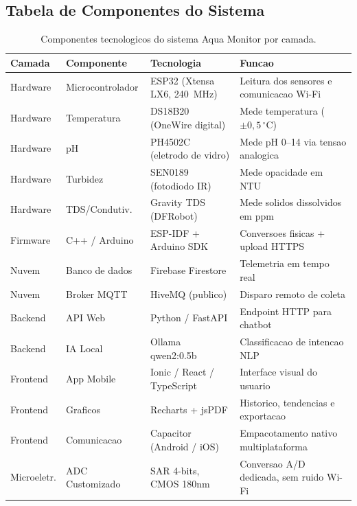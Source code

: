 \documentclass[12pt, a4paper]{article}
\begin{document}
\subsection{Tabela de Componentes do Sistema}

\begin{table}[H]
\centering
\small
\caption{Componentes tecnologicos do sistema Aqua Monitor por camada.}
\label{tab:componentes}
\begin{tabular}{p{2.0cm}p{2.4cm}p{4.2cm}p{4.8cm}}
\toprule
\textbf{Camada} & \textbf{Componente} & \textbf{Tecnologia} & \textbf{Funcao}\\
\midrule
Hardware    & Microcontrolador & ESP32 (Xtensa LX6, 240~MHz) & Leitura dos sensores e comunicacao Wi-Fi \\
Hardware    & Temperatura      & DS18B20 (OneWire digital)   & Mede temperatura ($\pm0{,}5\,^\circ$C) \\
Hardware    & pH               & PH4502C (eletrodo de vidro) & Mede pH 0--14 via tensao analogica \\
Hardware    & Turbidez         & SEN0189 (fotodiodo IR)      & Mede opacidade em NTU \\
Hardware    & TDS/Condutiv.    & Gravity TDS (DFRobot)       & Mede solidos dissolvidos em ppm \\
\midrule
Firmware    & C++ / Arduino    & ESP-IDF + Arduino SDK       & Conversoes fisicas + upload HTTPS \\
\midrule
Nuvem       & Banco de dados   & Firebase Firestore          & Telemetria em tempo real \\
Nuvem       & Broker MQTT      & HiveMQ (publico)            & Disparo remoto de coleta \\
\midrule
Backend     & API Web          & Python / FastAPI            & Endpoint HTTP para chatbot \\
Backend     & IA Local         & Ollama qwen2:0.5b           & Classificacao de intencao NLP \\
\midrule
Frontend    & App Mobile       & Ionic / React / TypeScript  & Interface visual do usuario \\
Frontend    & Graficos         & Recharts + jsPDF            & Historico, tendencias e exportacao \\
Frontend    & Comunicacao      & Capacitor (Android / iOS)   & Empacotamento nativo multiplataforma \\
\midrule
Microeletr. & ADC Customizado  & SAR 4-bits, CMOS 180nm      & Conversao A/D dedicada, sem ruido Wi-Fi \\
\bottomrule
\end{tabular}
\end{table}
\end{document}
